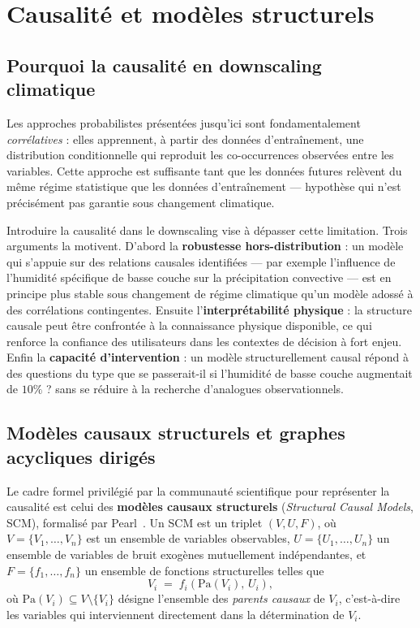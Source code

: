 \documentclass[14pt,a4paper,openany]{extreport}
\theoremstyle{definition}
\begin{document}
\section{Causalité et modèles structurels}
\label{sec:causalite}

\subsection{Pourquoi la causalité en downscaling climatique}
\label{ssec:why-causal}

Les approches probabilistes présentées jusqu'ici sont fondamentalement \emph{corrélatives} : elles apprennent, à partir des données d'entraînement, une distribution conditionnelle qui reproduit les co-occurrences observées entre les variables. Cette approche est suffisante tant que les données futures relèvent du même régime statistique que les données d'entraînement --- hypothèse qui n'est précisément pas garantie sous changement climatique.

Introduire la causalité dans le downscaling vise à dépasser cette limitation. Trois arguments la motivent. D'abord la \textbf{robustesse hors-distribution} : un modèle qui s'appuie sur des relations causales identifiées --- par exemple l'influence de l'humidité spécifique de basse couche sur la précipitation convective --- est en principe plus stable sous changement de régime climatique qu'un modèle adossé à des corrélations contingentes. Ensuite l'\textbf{interprétabilité physique} : la structure causale peut être confrontée à la connaissance physique disponible, ce qui renforce la confiance des utilisateurs dans les contextes de décision à fort enjeu. Enfin la \textbf{capacité d'intervention} : un modèle structurellement causal répond à des questions du type \og que se passerait-il si l'humidité de basse couche augmentait de $10\%$ ? \fg{} sans se réduire à la recherche d'analogues observationnels.

\subsection{Modèles causaux structurels et graphes acycliques dirigés}
\label{ssec:scm-dag}

Le cadre formel privilégié par la communauté scientifique pour représenter la causalité est celui des \textbf{modèles causaux structurels} (\emph{Structural Causal Models}, SCM), formalisé par Pearl~\cite{pearl_causality_2009,pearl_book_of_why_2018}. Un SCM est un triplet $(V, U, F)$, où $V = \{V_1, \dots, V_n\}$ est un ensemble de variables observables, $U = \{U_1, \dots, U_n\}$ un ensemble de variables de bruit exogènes mutuellement indépendantes, et $F = \{f_1, \dots, f_n\}$ un ensemble de fonctions structurelles telles que
\begin{equation}
  V_i \;=\; f_i\!\left(\mathrm{Pa}(V_i),\, U_i\right),
  \label{eq:scm}
\end{equation}
où $\mathrm{Pa}(V_i) \subseteq V \setminus \{V_i\}$ désigne l'ensemble des \emph{parents causaux} de $V_i$, c'est-à-dire les variables qui interviennent directement dans la détermination de $V_i$.
\end{document}
